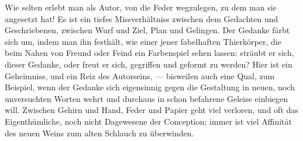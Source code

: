 Wie selten erlebt man als Autor, von  die Feder wegzulegen, zu dem man sie angesetzt hat! Es ist ein tiefes Missverhältniss zwischen dem Gedachten und Geschriebenen, zwischen Wurf und Ziel, Plan und Gelingen. Der Gedanke färbt sich um, indem man ihn festhält, wie einer jener fabelhaften Thierkörper, die beim Nahen von Freund oder Feind ein Farbenspiel sehen lassen: sträubt er sich, dieser Gedanke, oder freut er sich, gegriffen und geformt zu werden? Hier ist ein Geheimniss, und ein Reiz des Autorseins, — bisweilen auch eine Qual, zum Beispiel, wenn der Gedanke sich eigensinnig gegen die Gestaltung in neuen, noch unversuchten Worten wehrt und durchaus in schon befahrene Geleise einbiegen will. Zwischen Gehirn und Hand, Feder und Papier geht viel verloren, und oft das Eigenthümliche, noch nicht Dagewesene der Conception; immer ist viel Affinität des neuen Weins zum alten Schlauch zu überwinden.
\par

